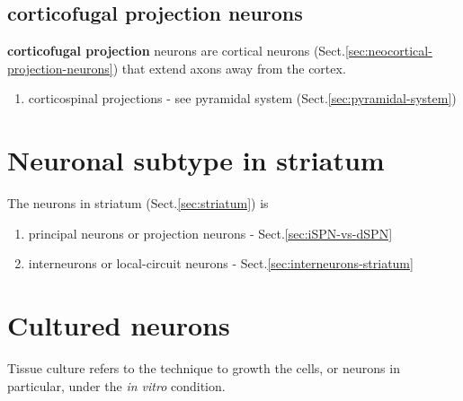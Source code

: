 \subsection{corticofugal projection neurons}
\label{sec:corticofugal-projection neurons}

{\bf corticofugal projection} neurons are cortical neurons
(Sect.\ref{sec:neocortical-projection-neurons}) that extend axons away from the
cortex.
\begin{enumerate}
  \item  corticospinal projections - see pyramidal system
  (Sect.\ref{sec:pyramidal-system})
\end{enumerate}


\section{Neuronal subtype in striatum}
\label{sec:striatal-neurons}

The neurons in striatum (Sect.\ref{sec:striatum}) is
\begin{enumerate}
  \item principal neurons or projection neurons - Sect.\ref{sec:iSPN-vs-dSPN}
  
  \item interneurons or local-circuit neurons - Sect.\ref{sec:interneurons-striatum}
\end{enumerate}



\section{Cultured neurons}
\label{sec:culture-neuron}
\label{sec:tissue-culture}

Tissue culture refers to the technique to growth the cells, or neurons in
particular, under the {\it in vitro} condition.

